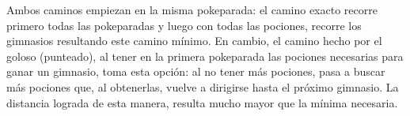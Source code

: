 Ambos caminos empiezan en la misma pokeparada: el camino exacto recorre primero todas las pokeparadas y luego con todas las pociones, recorre los gimnasios resultando este camino mínimo. En cambio, el camino hecho por el goloso (punteado), al tener en la primera pokeparada las pociones necesarias para ganar un gimnasio, toma esta opción: al no tener más pociones, pasa a buscar más pociones que, al obtenerlas, vuelve a dirigirse hasta el próximo gimnasio. La distancia lograda de esta manera, resulta mucho mayor que la mínima necesaria.